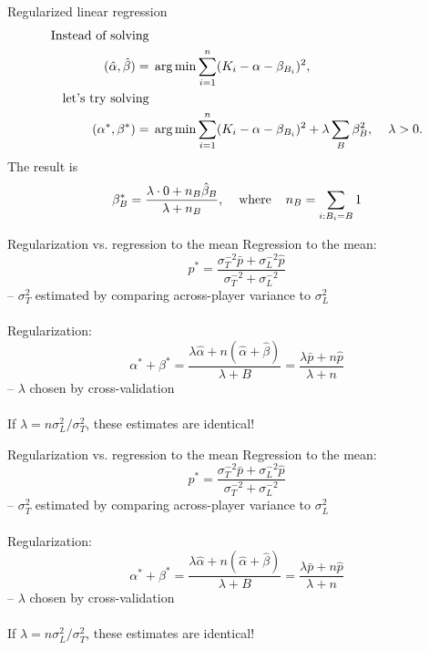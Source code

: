 \documentclass{beamer}
\begin{document}
\begin{frame}{Regularized linear regression}
\vspace{-1cm}
\begin{align*}
\mbox{Instead of solving}&\\   (\hat\alpha, \hat\beta) = & \hspace{1mm}
    \arg\min\sum_{i=1}^n(K_i - \alpha - \beta_{B_i})^2,\\
\mbox{let's try solving}&\\    (\alpha^*, \beta^*) = & \hspace{1mm}
    \arg\min\sum_{i=1}^n(K_i-\alpha-\beta_{B_i})^2 + \lambda\sum_B\beta_B^2,
    \hspace{4mm}\lambda > 0.
\end{align*}
The result is
$$\beta^*_B = \frac{\lambda\cdot0 + n_B\hat\beta_B}{\lambda + n_B},\hspace{4mm}
    \mbox{where}\hspace{4mm}n_B = \sum_{i:B_i=B}1$$
\end{frame}

\begin{frame}{Regularization vs. regression to the mean}
Regression to the mean:
$$p^* = \frac{\sigma_T^{-2}\bar p + \sigma_L^{-2}\hat p}
    {\sigma_T^{-2} + \sigma_L^{-2}}$$
{\color{white} -- $\sigma_T^2$ estimated by comparing across-player variance to
    $\sigma^2_L$}\\~\\
Regularization:
$$\alpha^* + \beta^* = \frac{\lambda\hat\alpha + n(\hat\alpha + \hat\beta)}
    {\lambda + B} = \frac{\lambda\bar p + n\hat p}{\lambda + n}$$
{\color{white} -- $\lambda$ chosen by cross-validation}\\~\\
If $\lambda = n\sigma^2_L/\sigma^2_T$, these estimates are identical!
\end{frame}

\begin{frame}{Regularization vs. regression to the mean}
Regression to the mean:
$$p^* = \frac{\sigma_T^{-2}\bar p + \sigma_L^{-2}\hat p}
    {\sigma_T^{-2} + \sigma_L^{-2}}$$
-- $\sigma_T^2$ estimated by comparing across-player variance to
    $\sigma^2_L$\\~\\
Regularization:
$$\alpha^* + \beta^* = \frac{\lambda\hat\alpha + n(\hat\alpha + \hat\beta)}
    {\lambda + B} = \frac{\lambda\bar p + n\hat p}{\lambda + n}$$
{\color{white} -- $\lambda$ chosen by cross-validation}\\~\\
If $\lambda = n\sigma^2_L/\sigma^2_T$, these estimates are identical!
\end{frame}
\end{document}
